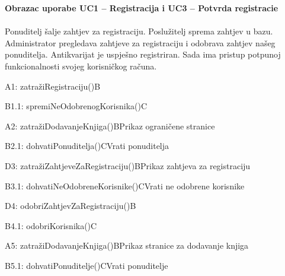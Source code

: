 				\textbf{Obrazac uporabe UC1 – Registracija i UC3 – Potvrda registracie}\\\\
				Ponuditelj šalje zahtjev za registraciju. Poslužitelj sprema zahtjev u bazu. Administrator pregledava zahtjeve za registraciju i odobrava zahtjev našeg ponuditelja. Antikvarijat je uspješno registriran. Sada ima pristup potpunoj funkcionalnosti svojeg korisničkog računa.\\
				\begin{center}
					\begin{adjustbox}{max width=\textwidth}
						\begin{sequencediagram}
							\begin{messcall}{A}{1: zatražiRegistraciju()}{B}
								\begin{messcall}{B}{1.1: spremiNeOdobrenogKorisnika()}{C}
								\end{messcall}
							\end{messcall}
							\begin{call}{A}{2: zatražiDodavanjeKnjiga()}{B}{Prikaz ograničene stranice}
								\begin{call}{B}{2.1: dohvatiPonuditelja()}{C}{Vrati ponuditelja}
								\end{call}
							\end{call}
							\begin{call}{D}{3: zatražiZahtjeveZaRegistraciju()}{B}{Prikaz zahtjeva za registraciju}
								\begin{call}{B}{3.1: dohvatiNeOdobreneKorisnike()}{C}{Vrati ne odobrene korisnike}
								\end{call}
							\end{call}
							\postlevel
							\begin{messcall}{D}{4: odobriZahtjevZaRegistraciju()}{B}
								\begin{messcall}{B}{4.1: odobriKorisnika()}{C}
								\end{messcall}
							\end{messcall}
							\begin{call}{A}{5: zatražiDodavanjeKnjiga()}{B}{Prikaz stranice za dodavanje knjiga}
								\begin{call}{B}{5.1: dohvatiPonuditelje()}{C}{Vrati ponuditelje}
								\end{call}
							\end{call}
						\end{sequencediagram}
					\end{adjustbox}
				\end{center}
				\eject
				
